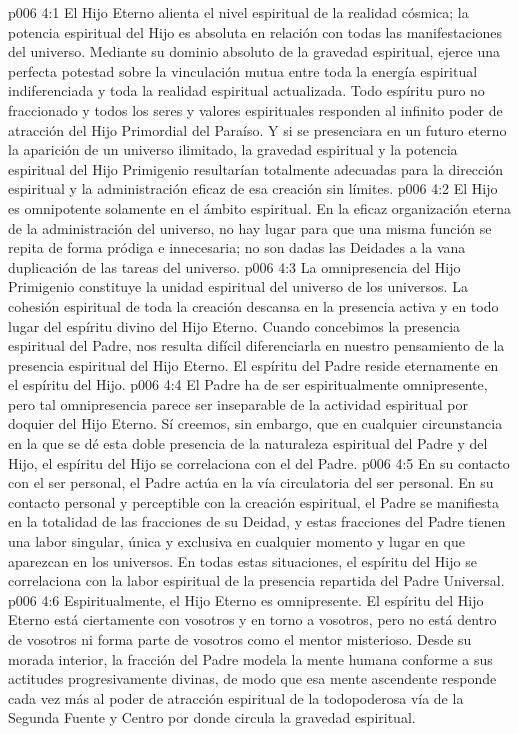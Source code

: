 \vs p006 4:1 El Hijo Eterno alienta el nivel espiritual de la realidad cósmica; la potencia espiritual del Hijo es absoluta en relación con todas las manifestaciones del universo. Mediante su dominio absoluto de la gravedad espiritual, ejerce una perfecta potestad sobre la vinculación mutua entre toda la energía espiritual indiferenciada y toda la realidad espiritual actualizada. Todo espíritu puro no fraccionado y todos los seres y valores espirituales responden al infinito poder de atracción del Hijo Primordial del Paraíso. Y si se presenciara en un futuro eterno la aparición de un universo ilimitado, la gravedad espiritual y la potencia espiritual del Hijo Primigenio resultarían totalmente adecuadas para la dirección espiritual y la administración eficaz de esa creación sin límites.
\vs p006 4:2 \pc El Hijo es omnipotente solamente en el ámbito espiritual. En la eficaz organización eterna de la administración del universo, no hay lugar para que una misma función se repita de forma pródiga e innecesaria; no son dadas las Deidades a la vana duplicación de las tareas del universo.
\vs p006 4:3 \pc La omnipresencia del Hijo Primigenio constituye la unidad espiritual del universo de los universos. La cohesión espiritual de toda la creación descansa en la presencia activa y en todo lugar del espíritu divino del Hijo Eterno. Cuando concebimos la presencia espiritual del Padre, nos resulta difícil diferenciarla en nuestro pensamiento de la presencia espiritual del Hijo Eterno. El espíritu del Padre reside eternamente en el espíritu del Hijo.
\vs p006 4:4 El Padre ha de ser espiritualmente omnipresente, pero tal omnipresencia parece ser inseparable de la actividad espiritual por doquier del Hijo Eterno. Sí creemos, sin embargo, que en cualquier circunstancia en la que se dé esta doble presencia de la naturaleza espiritual del Padre y del Hijo, el espíritu del Hijo se correlaciona con el del Padre.
\vs p006 4:5 En su contacto con el ser personal, el Padre actúa en la vía circulatoria del ser personal. En su contacto personal y perceptible con la creación espiritual, el Padre se manifiesta en la totalidad de las fracciones de su Deidad, y estas fracciones del Padre tienen una labor singular, única y exclusiva en cualquier momento y lugar en que aparezcan en los universos. En todas estas situaciones, el espíritu del Hijo se correlaciona con la labor espiritual de la presencia repartida del Padre Universal.
\vs p006 4:6 Espiritualmente, el Hijo Eterno es omnipresente. El espíritu del Hijo Eterno está ciertamente con vosotros y en torno a vosotros, pero no está dentro de vosotros ni forma parte de vosotros como el mentor misterioso. Desde su morada interior, la fracción del Padre modela la mente humana conforme a sus actitudes progresivamente divinas, de modo que esa mente ascendente responde cada vez más al poder de atracción espiritual de la todopoderosa vía de la Segunda Fuente y Centro por donde circula la gravedad espiritual.
